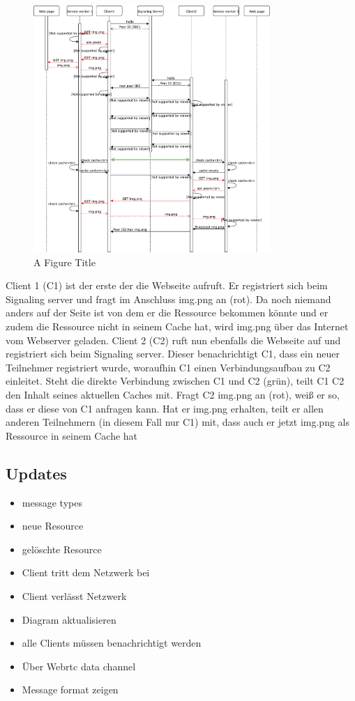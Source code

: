 \begin{figure}[!h]
	\centering
	\includegraphics[width=0.8\textwidth]{figures/SequenceDiagram}
	\caption[A Figure Short-Title]{A Figure Title}
	\label{fig:sequenceDiagram}
\end{figure}

Client 1 (C1) ist der erste der die Webseite aufruft. Er registriert sich beim Signaling server und fragt im Anschluss img.png an (rot). Da noch niemand anders auf der Seite ist von dem er die Ressource bekommen könnte und er zudem die Ressource nicht in seinem Cache hat, wird img.png über das Internet vom Webserver geladen. Client 2 (C2) ruft nun ebenfalls die Webseite auf und registriert sich beim Signaling server. Dieser benachrichtigt C1, dass ein neuer Teilnehmer registriert wurde, woraufhin C1 einen Verbindungsaufbau zu C2 einleitet. Steht die direkte Verbindung zwischen C1 und C2 (grün), teilt C1 C2 den Inhalt seines aktuellen Caches mit. Fragt C2 img.png an (rot), weiß er so, dass er diese von C1 anfragen kann. Hat er img.png erhalten, teilt er allen anderen Teilnehmern (in diesem Fall nur C1) mit, dass auch er jetzt img.png als Ressource in seinem Cache hat

\subsection{Updates}
\begin{itemize}
	\item message types
	\item neue Resource
	\item gelöschte Resource
	\item Client tritt dem Netzwerk bei
	\item Client verlässt Netzwerk
	\item Diagram aktualisieren
	\item alle Clients müssen benachrichtigt werden
	\item Über Webrtc data channel
	\item Message format zeigen
\end{itemize}
